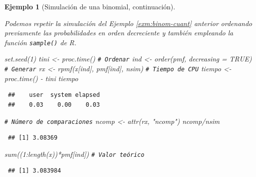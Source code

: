 \documentclass[
]{book}
\newenvironment{Shaded}{\begin{snugshade}}{\end{snugshade}}
\newcommand{\AttributeTok}[1]{\textcolor[rgb]{0.77,0.63,0.00}{#1}}
\newcommand{\CommentTok}[1]{\textcolor[rgb]{0.56,0.35,0.01}{\textit{#1}}}
\newcommand{\ConstantTok}[1]{\textcolor[rgb]{0.00,0.00,0.00}{#1}}
\newcommand{\DecValTok}[1]{\textcolor[rgb]{0.00,0.00,0.81}{#1}}
\newcommand{\FunctionTok}[1]{\textcolor[rgb]{0.00,0.00,0.00}{#1}}
\newcommand{\NormalTok}[1]{#1}
\newcommand{\OtherTok}[1]{\textcolor[rgb]{0.56,0.35,0.01}{#1}}
\newcommand{\SpecialCharTok}[1]{\textcolor[rgb]{0.00,0.00,0.00}{#1}}
\newcommand{\StringTok}[1]{\textcolor[rgb]{0.31,0.60,0.02}{#1}}
\theoremstyle{break}
\newtheorem{example}{Ejemplo}[chapter]
\theoremstyle{nonumberplain}
\renewcommand{\CommentTok}[1]{\textcolor[rgb]{0.41,0.41,0.41}{\texttt{#1}}}
\begin{document}
\begin{example}[Simulación de una binomial, continuación]
\protect\hypertarget{exm:binom-cuantb}{}\label{exm:binom-cuantb}

Podemos repetir la simulación del Ejemplo \ref{exm:binom-cuant} anterior ordenando previamente las probabilidades en orden decreciente y también empleando la función \texttt{sample()} de R.

\begin{Shaded}
\begin{Highlighting}[]
\FunctionTok{set.seed}\NormalTok{(}\DecValTok{1}\NormalTok{)}
\NormalTok{tini }\OtherTok{\textless{}{-}} \FunctionTok{proc.time}\NormalTok{()}
\CommentTok{\# Ordenar}
\NormalTok{ind }\OtherTok{\textless{}{-}} \FunctionTok{order}\NormalTok{(pmf, }\AttributeTok{decreasing =} \ConstantTok{TRUE}\NormalTok{)}
\CommentTok{\# Generar}
\NormalTok{rx }\OtherTok{\textless{}{-}} \FunctionTok{rpmf}\NormalTok{(x[ind], pmf[ind], nsim)}
\CommentTok{\# Tiempo de CPU}
\NormalTok{tiempo }\OtherTok{\textless{}{-}} \FunctionTok{proc.time}\NormalTok{() }\SpecialCharTok{{-}}\NormalTok{ tini}
\NormalTok{tiempo}
\end{Highlighting}
\end{Shaded}

\begin{verbatim}
 ##    user  system elapsed 
 ##    0.03    0.00    0.03
\end{verbatim}

\begin{Shaded}
\begin{Highlighting}[]
\CommentTok{\# Número de comparaciones}
\NormalTok{ncomp }\OtherTok{\textless{}{-}} \FunctionTok{attr}\NormalTok{(rx, }\StringTok{"ncomp"}\NormalTok{)}
\NormalTok{ncomp}\SpecialCharTok{/}\NormalTok{nsim}
\end{Highlighting}
\end{Shaded}

\begin{verbatim}
 ## [1] 3.08369
\end{verbatim}

\begin{Shaded}
\begin{Highlighting}[]
\FunctionTok{sum}\NormalTok{((}\DecValTok{1}\SpecialCharTok{:}\FunctionTok{length}\NormalTok{(x))}\SpecialCharTok{*}\NormalTok{pmf[ind]) }\CommentTok{\# Valor teórico}
\end{Highlighting}
\end{Shaded}

\begin{verbatim}
 ## [1] 3.083984
\end{verbatim}


\end{example}
\end{document}

